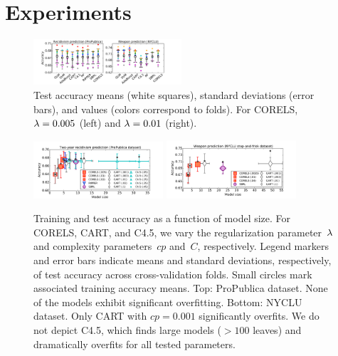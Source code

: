\section{Experiments}
\label{sec:experiments}

\begin{figure}[t!]
\begin{center}
\includegraphics[trim={12mm, 11mm, 25mm, 5mm},
width=0.49\textwidth]{figs/compare-compas-weapon.pdf}
\end{center}
\caption{Test accuracy means (white squares),
standard deviations (error bars),
and values (colors correspond to folds).
For CORELS, ${{\lambda} = 0.005}$ (left) and ${{\lambda} = 0.01}$ (right).
}
\label{fig:comparison}
\end{figure}

\begin{figure}[t!]
\begin{center}
\includegraphics[trim={12mm, 0mm, 24mm, 5mm}, width=0.43\textwidth]{figs/compas-sparsity-training.pdf}
\includegraphics[trim={12mm, 12mm, 24mm, 1mm}, width=0.43\textwidth]{figs/frisk-sparsity-training.pdf}
\end{center}
\caption{Training and test accuracy as a function of model size.
%
For CORELS, CART, and C4.5, we vary the regularization parameter~${\lambda}$
and complexity parameters~$cp$ and~$C$, respectively.
%
Legend markers and error bars indicate means and standard deviations,
respectively, of test accuracy across cross-validation folds.
%
Small circles mark associated training accuracy means.
%
Top:  %
ProPublica dataset.
%
None of the models exhibit significant overfitting.
%
Bottom:  %
NYCLU dataset.
%
Only CART with ${cp = 0.001}$ significantly overfits.
%
We do not depict C4.5, which finds large models (${>100}$ leaves)
and dramatically overfits for all tested parameters.
}
\label{fig:sparsity}
\end{figure}

